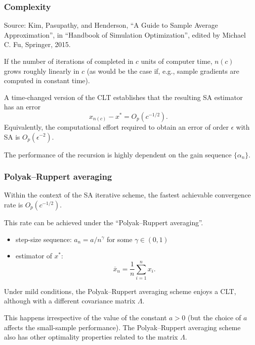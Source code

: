 \documentclass[usepdftitle=false, aspectratio=169]{beamer}
\begin{document}
\begin{frame}
\frametitle{Complexity}

Source: Kim, Pasupathy, and Henderson, ``A Guide to Sample Average Approximation'', in ``Handbook of Simulation Optimization'', edited by Michael C. Fu, Springer, 2015.

\mbox{}

If the number of iterations of completed in $c$ units of computer time, $n(c)$ grows roughly linearly in $c$
(as would be the case if, e.g., sample gradients are computed in constant time).

\mbox{}

A time-changed version of the CLT establishes that the resulting SA estimator has
an error
$$
x_{n(c)} - x^* = O_p(c^{-1/2}).
$$
Equivalently, the computational effort required to obtain an error of order $\epsilon$ with SA is $O_p(\epsilon^{-2})$.

\mbox{}

The performance of the recursion is highly dependent on the gain sequence $\{ \alpha_n \}$.

\end{frame}

\begin{frame}
\frametitle{Polyak–Ruppert averaging}

Within the context of the SA iterative scheme, the fastest achievable convergence rate is $O_p(c^{-1/2})$.

\mbox{}

This rate can be achieved under the ``Polyak–Ruppert averaging''.
\begin{itemize}
	\item 
step-size sequence: $a_n = a/{n^{\gamma}}$ for some $\gamma \in (0,1)$
\item
estimator of ${x}^*$:
$$
\overline{x}_n = \frac{1}{n} \sum_{i = 1}^n x_i.
$$
\end{itemize}

Under mild conditions, the Polyak–Ruppert averaging scheme enjoys a CLT, although with a different covariance matrix $\Lambda$.

\mbox{}

This happens irrespective of the value of the constant $a > 0$ (but the choice of $a$ affects the small-sample performance).
The Polyak–Ruppert averaging scheme also has other optimality properties related to
the matrix $\Lambda$.

\end{frame}
\end{document}
